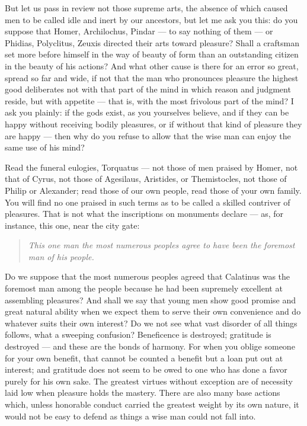 But let us pass in review not those supreme arts, the absence of which caused men to be called idle and inert by our ancestors, but let me ask you this: do you suppose that Homer, Archilochus, Pindar — to say nothing of them — or Phidias, Polyclitus, Zeuxis directed their arts toward pleasure? Shall a craftsman set more before himself in the way of beauty of form than an outstanding citizen in the beauty of his actions? And what other cause is there for an error so great, spread so far and wide, if not that the man who pronounces pleasure the highest good deliberates not with that part of the mind in which reason and judgment reside, but with appetite — that is, with the most frivolous part of the mind? I ask you plainly: if the gods exist, as you yourselves believe, and if they can be happy without receiving bodily pleasures, or if without that kind of pleasure they are happy — then why do you refuse to allow that the wise man can enjoy the same use of his mind?

Read the funeral eulogies, Torquatus — not those of men praised by Homer, not that of Cyrus, not those of Agesilaus, Aristides, or Themistocles, not those of Philip or Alexander; read those of our own people, read those of your own family. You will find no one praised in such terms as to be called a skilled contriver of pleasures. That is not what the inscriptions on monuments declare — as, for instance, this one, near the city gate:

\begin{quote}
\textit{This one man the most numerous peoples agree to have been the foremost man of his people.}
\end{quote}

Do we suppose that the most numerous peoples agreed that Calatinus was the foremost man among the people because he had been supremely excellent at assembling pleasures? And shall we say that young men show good promise and great natural ability when we expect them to serve their own convenience and do whatever suits their own interest? Do we not see what vast disorder of all things follows, what a sweeping confusion? Beneficence is destroyed; gratitude is destroyed — and these are the bonds of harmony. For when you oblige someone for your own benefit, that cannot be counted a benefit but a loan put out at interest; and gratitude does not seem to be owed to one who has done a favor purely for his own sake. The greatest virtues without exception are of necessity laid low when pleasure holds the mastery. There are also many base actions which, unless honorable conduct carried the greatest weight by its own nature, it would not be easy to defend as things a wise man could not fall into.

